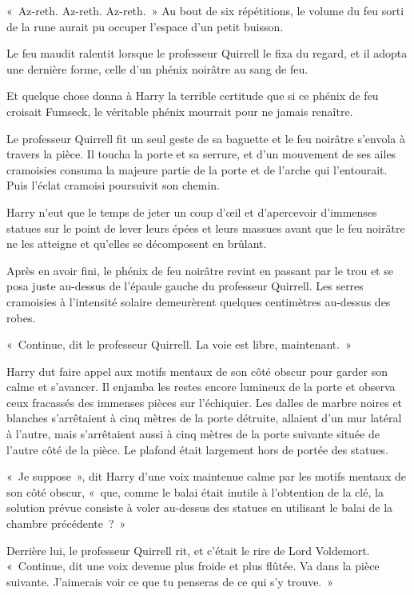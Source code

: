 «~Az-reth. Az-reth. Az-reth.~» Au bout de six répétitions, le volume du feu sorti de la rune aurait pu occuper l'espace d'un petit buisson.

Le feu maudit ralentit lorsque le professeur Quirrell le fixa du regard, et il adopta une dernière forme, celle d'un phénix noirâtre au sang de feu.

Et quelque chose donna à Harry la terrible certitude que si ce phénix de feu croisait Fumseck, le véritable phénix mourrait pour ne jamais renaître.

Le professeur Quirrell fit un seul geste de sa baguette et le feu noirâtre s'envola à travers la pièce. Il toucha la porte et sa serrure, et d'un mouvement de ses ailes cramoisies consuma la majeure partie de la porte et de l'arche qui l'entourait. Puis l'éclat cramoisi poursuivit son chemin.

Harry n'eut que le temps de jeter un coup d'œil et d'apercevoir d'immenses statues sur le point de lever leurs épées et leurs massues avant que le feu noirâtre ne les atteigne et qu'elles se décomposent en brûlant.

Après en avoir fini, le phénix de feu noirâtre revint en passant par le trou et se posa juste au-dessus de l'épaule gauche du professeur Quirrell. Les serres cramoisies à l'intensité solaire demeurèrent quelques centimètres au-dessus des robes.

«~Continue, dit le professeur Quirrell. La voie est libre, maintenant.~»

Harry dut faire appel aux motifs mentaux de son côté obscur pour garder son calme et s'avancer. Il enjamba les restes encore lumineux de la porte et observa ceux fracassés des immenses pièces sur l'échiquier. Les dalles de marbre noires et blanches s'arrêtaient à cinq mètres de la porte détruite, allaient d'un mur latéral à l'autre, mais s'arrêtaient aussi à cinq mètres de la porte suivante située de l'autre côté de la pièce. Le plafond était largement hors de portée des statues.

«~Je suppose~», dit Harry d'une voix maintenue calme par les motifs mentaux de son côté obscur, «~que, comme le balai était inutile à l'obtention de la clé, la solution prévue consiste à voler au-dessus des statues en utilisant le balai de la chambre précédente~?~»

Derrière lui, le professeur Quirrell rit, et c'était le rire de Lord Voldemort. «~Continue, dit une voix devenue plus froide et plus flûtée. Va dans la pièce suivante. J'aimerais voir ce que tu penseras de ce qui s'y trouve.~»

